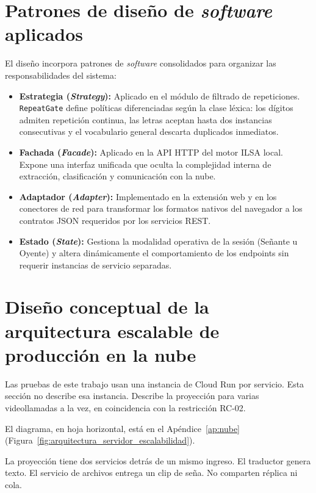\section{Patrones de diseño de \textit{software} aplicados}
El diseño incorpora patrones de \textit{software} consolidados para organizar las responsabilidades del sistema:
\begin{itemize}
    \item \textbf{Estrategia (\textit{Strategy}):} Aplicado en el módulo de filtrado de repeticiones. \texttt{RepeatGate} define políticas diferenciadas según la clase léxica: los dígitos admiten repetición continua, las letras aceptan hasta dos instancias consecutivas y el vocabulario general descarta duplicados inmediatos.
    \item \textbf{Fachada (\textit{Facade}):} Aplicado en la API HTTP del motor ILSA local. Expone una interfaz unificada que oculta la complejidad interna de extracción, clasificación y comunicación con la nube.
    \item \textbf{Adaptador (\textit{Adapter}):} Implementado en la extensión web y en los conectores de red para transformar los formatos nativos del navegador a los contratos JSON requeridos por los servicios REST.
    \item \textbf{Estado (\textit{State}):} Gestiona la modalidad operativa de la sesión (Señante u Oyente) y altera dinámicamente el comportamiento de los endpoints sin requerir instancias de servicio separadas.
\end{itemize}

\section{Diseño conceptual de la arquitectura escalable de producción en la nube}
\label{sec:arq_escalable}

Las pruebas de este trabajo usan una instancia de Cloud Run por servicio. Esta sección no describe esa instancia. Describe la proyección para varias videollamadas a la vez, en coincidencia con la restricción RC-02.

El diagrama, en hoja horizontal, está en el Apéndice~\ref{ap:nube} (Figura~\ref{fig:arquitectura_servidor_escalabilidad}).

La proyección tiene dos servicios detrás de un mismo ingreso. El traductor genera texto. El servicio de archivos entrega un clip de seña. No comparten réplica ni cola.

